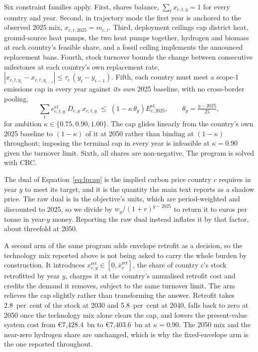 Six constraint families apply. First, shares balance, $\sum_{t} x_{c,t,y} = 1$ for every
country and year. Second, in trajectory mode the first year is anchored to the observed 2025
mix, $x_{c,t,2025} = m_{c,t}$. Third, deployment ceilings cap district heat, ground-source
heat pumps, the two heat pumps together, hydrogen and biomass at each country's feasible
share, and a fossil ceiling implements the announced replacement bans. Fourth, stock turnover
bounds the change between consecutive milestones at each country's own replacement rate,
$|x_{c,t,y_{i}} - x_{c,t,y_{i-1}}| \le \tau_{c}\,(y_{i}-y_{i-1})$. Fifth, each country must
meet a scope-1 emissions cap in every year against \emph{its own} 2025 baseline, with no
cross-border pooling,
%
\begin{equation}
 \sum_{t} e^{\text{s1}}_{c,t,y}\; D_{c,y}\; x_{c,t,y}
 \;\le\; \left(1-\kappa\,\theta_{y}\right) E^{\text{s1}}_{c,2025},
 \qquad \theta_{y}=\tfrac{y-2025}{25},
 \label{eq:lpcap}
\end{equation}
%
for ambition $\kappa \in \{0.75, 0.90, 1.00\}$. The cap glides linearly from the country's
own 2025 baseline to $(1-\kappa)$ of it at 2050 rather than binding at $(1-\kappa)$
throughout; imposing the terminal cap in every year is infeasible at $\kappa=0.90$ given
the turnover limit. Sixth, all shares are non-negative. The program is solved with CBC.

The dual of Equation~\eqref{eq:lpcap} is the implied carbon price country $c$ requires in year
$y$ to meet its target, and it is the quantity the main text reports as a shadow price. The raw
dual is in the objective's units, which are period-weighted and discounted to 2025, so we
divide by $w_{y}/(1+r)^{y-2025}$ to return it to euros per tonne in year-$y$ money. Reporting
the raw dual instead inflates it by that factor, about threefold at 2050.

A second arm of the same program adds envelope retrofit as a decision, so the technology
mix reported above is not being asked to carry the whole burden by construction. It
introduces $x^{\mathrm{ret}}_{c,y} \in [0, \bar{x}^{\mathrm{ret}}_{c}]$, the share of
country $c$'s stock retrofitted by year $y$, charges it at the country's annualised
retrofit cost and credits the demand it removes, subject to the same turnover limit. The
arm relieves the cap slightly rather than transforming the answer. Retrofit takes
2.8~per~cent of the stock at 2030 and 5.8~per~cent at 2040, falls back to zero at 2050
once the technology mix alone clears the cap, and lowers the present-value system cost
from \euro{}7{,}428.4~bn to \euro{}7{,}403.6~bn at $\kappa = 0.90$. The 2050 mix and the
near-zero hydrogen share are unchanged, which is why the fixed-envelope arm is the one
reported throughout.

